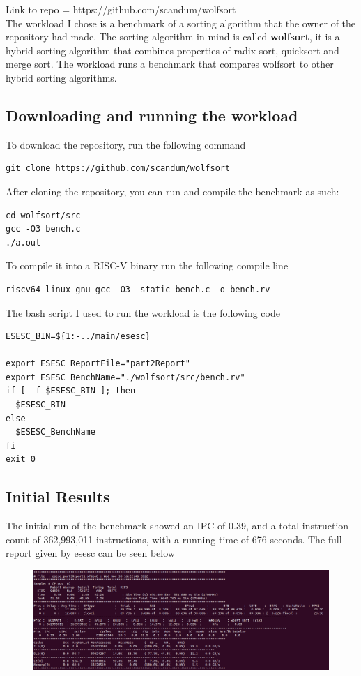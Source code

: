 \documentclass[12pt]{article}
\begin{document}
Link to repo = https://github.com/scandum/wolfsort\\

The workload I chose is a benchmark of a sorting algorithm that the owner of the repository had made. The sorting algorithm in mind is called \textbf{wolfsort}, it is a hybrid sorting algorithm that combines properties of radix sort, quicksort and merge sort. The workload runs a benchmark that compares wolfsort to other hybrid sorting algorithms.

\subsection*{Downloading and running the workload}
To download the repository, run the following command
\begin{verbatim}
git clone https://github.com/scandum/wolfsort
\end{verbatim}
After cloning the repository, you can run and compile the benchmark as such:
\begin{verbatim}
cd wolfsort/src
gcc -O3 bench.c
./a.out
\end{verbatim}
To compile it into a RISC-V binary run the following compile line
\begin{verbatim}
riscv64-linux-gnu-gcc -O3 -static bench.c -o bench.rv 
\end{verbatim}
The bash script I used to run the workload is the following code
\begin{verbatim}
ESESC_BIN=${1:-../main/esesc}

export ESESC_ReportFile="part2Report"
export ESESC_BenchName="./wolfsort/src/bench.rv"
if [ -f $ESESC_BIN ]; then
  $ESESC_BIN 
else
  $ESESC_BenchName 
fi
exit 0
\end{verbatim}
\newpage
\subsection*{Initial Results}
The initial run of the benchmark showed an IPC of 0.39, and a total instruction count of 362,993,011 instructions, with a running time of 676 seconds. The full report given by esesc can be seen below

\begin{figure}[h!]
	\includegraphics[scale=0.4]{base.png}
\end{figure}
\end{document}

